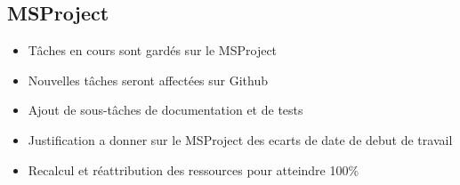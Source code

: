 \documentclass{article}
\begin{document}
\subsection{MSProject}
\begin{itemize}
	\item T\^aches en cours sont gard\'es sur le MSProject
	\item Nouvelles t\^aches seront affect\'ees sur Github
	\item Ajout de sous-t\^aches de documentation et de tests
	\item Justification a donner sur le MSProject des ecarts de date de
		debut de travail
	\item Recalcul et r\'eattribution des ressources pour atteindre 100\%
\end{itemize}
\end{document}
